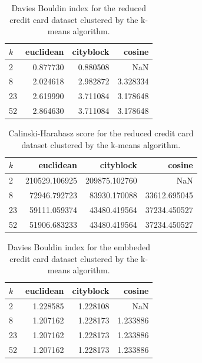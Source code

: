 \begin{table}[ht!]
    \centering
     \begin{tabular}{lrrr}
\toprule
$k$ &  euclidean &  cityblock &    cosine \\
\midrule
2  &   0.877730 &   0.880508 &       NaN \\
8  &   2.024618 &   2.982872 &  3.328334 \\
23 &   2.619990 &   3.711084 &  3.178648 \\
52 &   2.864630 &   3.711084 &  3.178648 \\
\bottomrule
\end{tabular}
    \caption{Davies Bouldin index for the reduced credit card dataset clustered by the k-means algorithm.}
    \label{tab:c2_db_k}
\end{table}

\begin{table}[ht!]
    \centering
    \begin{tabular}{lrrr}
\toprule
$k$ &      euclidean &      cityblock &        cosine \\
\midrule
2  &  210529.106925 &  209875.102760 &           NaN \\
8  &   72946.792723 &   83930.170088 &  33612.695045 \\
23 &   59111.059374 &   43480.419564 &  37234.450527 \\
52 &   51906.683233 &   43480.419564 &  37234.450527 \\
\bottomrule
\end{tabular}
    \caption{Calinski-Harabasz score for the reduced credit card dataset clustered by the k-means algorithm.}
    \label{tab:c2_ch_k}
\end{table}

\begin{table}[ht!]
    \centering
    \begin{tabular}{lrrr}
\toprule
$k$ &  euclidean &  cityblock &    cosine \\
\midrule
2  &   1.228585 &   1.228108 &       NaN \\
8  &   1.207162 &   1.228173 &  1.233886 \\
23 &   1.207162 &   1.228173 &  1.233886 \\
52 &   1.207162 &   1.228173 &  1.233886 \\
\bottomrule
\end{tabular}
    \caption{Davies Bouldin index for the embbeded credit card dataset clustered by the k-means algorithm.}
    \label{tab:ce_db_k}
\end{table}

